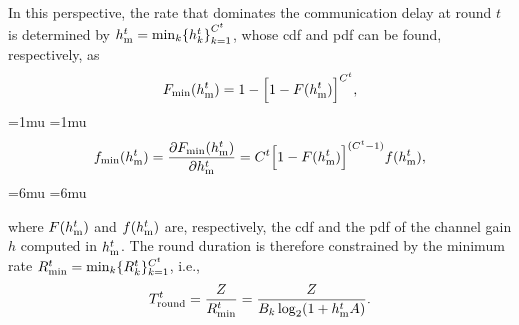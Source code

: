 \documentclass[10pt, conference, letterpaper]{IEEEtran}
\begin{document}
	
	In this perspective, the rate that dominates the communication delay at round $t$ is determined by
	${h_{\rm m}^t = \min_k\{ h_k^t\}}_{k=1}^{C^t}$,
	whose \gls{cdf} and \gls{pdf} can be found, respectively, as
	\begin{equation}
		F_{\rm min}(h_{\rm m}^t) =  1-\Big[1-F(h_{\rm m}^t)\Big]^{C^t},
	\end{equation}
	\medmuskip=1mu
	\thickmuskip=1mu
	\begin{equation}
		f_{\rm min} (h_{\rm m}^t) = \frac{\partial F_{\rm min}(h_{\rm m}^t)}{\partial h_{\rm m}^t} = C^t\Big[1 - F(h_{\rm m}^t)\Big]^{(C^t-1)} f(h_{\rm m}^t),
	\end{equation}
	\medmuskip=6mu
	\thickmuskip=6mu
	
	where $F(h_{\rm m}^t)$ and $f(h_{\rm m}^t)$ are, respectively, the \gls{cdf} and the \gls{pdf} of the channel gain $h$ computed in $h_{\rm m}^t$.
	The round duration is therefore constrained by the minimum rate ${R_{\rm min}^t = \min_k \{R^t_k\}_{k=1}^{C^t}}$, i.e.,
	\begin{equation}
		T_{\rm round}^t = \frac{Z}{{R_{\rm min}^t}}=\frac{Z}{B_k \log_2(1 + h_{\rm m}^t A)}.
		\label{eq:T_csi}
	\end{equation}
	
\end{document}
